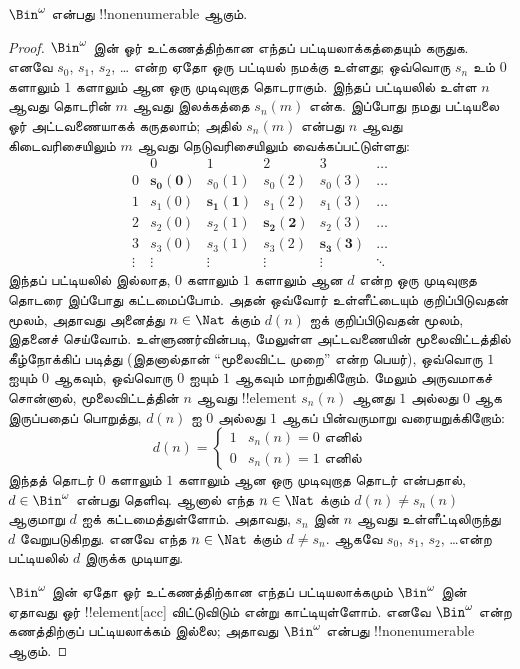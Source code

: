 \documentclass[../../../include/open-logic-section]{subfiles}
\begin{document}
\begin{thm}
$\Bin^\omega$ என்பது !!{nonenumerable} ஆகும்.
\end{thm}

\begin{proof}
$\Bin^\omega$ இன் ஓர் உட்கணத்திற்கான எந்தப் பட்டியலாக்கத்தையும்
கருதுக. எனவே $s_{0}$, $s_{1}$, $s_{2}$, \dots{} என்ற ஏதோ ஒரு
பட்டியல் நமக்கு உள்ளது; ஒவ்வொரு $s_n$ உம் $0$ களாலும் $1$ களாலும்
ஆன ஒரு முடிவுறாத தொடராகும்.
இந்தப் பட்டியலில் உள்ள $n$ ஆவது தொடரின் $m$ ஆவது இலக்கத்தை
$s_n(m)$ என்க.
இப்போது நமது பட்டியலை ஓர் அட்டவணையாகக் கருதலாம்;
அதில் $s_n(m)$ என்பது $n$ ஆவது கிடைவரிசையிலும்
$m$ ஆவது நெடுவரிசையிலும் வைக்கப்பட்டுள்ளது:
\[
\begin{array}{c|c|c|c|c|c}
& 0 & 1 & 2 & 3 & \dots \\ \hline
0 & \mathbf{s_{0}(0)} & s_{0}(1) & s_{0}(2) & s_0(3) & \dots \\ \hline
1 & s_{1}(0)& \mathbf{s_{1}(1)} & s_1(2) & s_1(3) & \dots \\ \hline
2 & s_{2}(0)& s_{2}(1) & \mathbf{s_2(2)} & s_2(3) & \dots \\ \hline
3 & s_{3}(0)& s_{3}(1) & s_3(2) & \mathbf{s_3(3)} & \dots \\ \hline
\vdots & \vdots & \vdots & \vdots & \vdots & \mathbf{\ddots}
\end{array}
\]
இந்தப் பட்டியலில் இல்லாத, $0$ களாலும் $1$ களாலும் ஆன
$d$ என்ற ஒரு முடிவுறாத தொடரை இப்போது கட்டமைப்போம்.
அதன் ஒவ்வோர் உள்ளீட்டையும் குறிப்பிடுவதன் மூலம்,
அதாவது அனைத்து $n \in \Nat$ க்கும் $d(n)$ ஐக் குறிப்பிடுவதன் மூலம்,
இதனைச் செய்வோம்.
உள்ளுணர்வின்படி, மேலுள்ள அட்டவணையின் மூலைவிட்டத்தில் கீழ்நோக்கிப்
படித்து (இதனால்தான் ``மூலைவிட்ட முறை'' என்ற பெயர்),
ஒவ்வொரு $1$ ஐயும் $0$ ஆகவும், ஒவ்வொரு $0$ ஐயும் $1$ ஆகவும்
மாற்றுகிறோம்.
மேலும் அருவமாகச் சொன்னால், மூலைவிட்டத்தின் $n$ ஆவது !!{element}
$s_n(n)$ ஆனது $1$ அல்லது $0$ ஆக இருப்பதைப் பொறுத்து,
$d(n)$ ஐ $0$ அல்லது $1$ ஆகப் பின்வருமாறு வரையறுக்கிறோம்:
\[
d(n) =
\begin{cases}
1 & \text{$s_{n}(n) = 0$ எனில்}\\
0 & \text{$s_{n}(n) = 1$ எனில்}
\end{cases}
\]
இந்தத் தொடர் $0$ களாலும் $1$ களாலும் ஆன ஒரு முடிவுறாத தொடர் என்பதால்,
$d \in \Bin^\omega$ என்பது தெளிவு.
ஆனால் எந்த $n \in \Nat$ க்கும் $d(n) \neq s_n(n)$ ஆகுமாறு
$d$ ஐக் கட்டமைத்துள்ளோம்.
அதாவது, $s_n$ இன் $n$ ஆவது உள்ளீட்டிலிருந்து $d$ வேறுபடுகிறது.
எனவே எந்த $n\in \Nat$ க்கும் $d \neq s_n$.
ஆகவே $s_0$, $s_1$, $s_2$, \dots என்ற பட்டியலில் $d$ இருக்க முடியாது.

$\Bin^\omega$ இன் ஏதோ ஓர் உட்கணத்திற்கான எந்தப் பட்டியலாக்கமும்
$\Bin^\omega$ இன் ஏதாவது ஓர் !!{element}[acc] விட்டுவிடும் என்று
காட்டியுள்ளோம்.
எனவே $\Bin^\omega$ என்ற கணத்திற்குப் பட்டியலாக்கம் இல்லை;
அதாவது $\Bin^\omega$ என்பது !!{nonenumerable} ஆகும்.
\end{proof}
\end{document}
